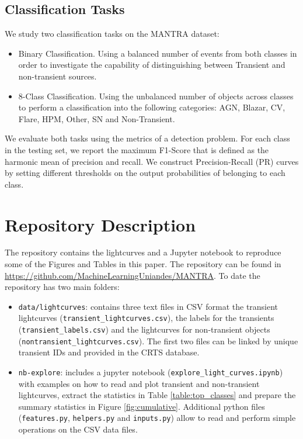 \documentclass{aastex62}
\begin{document}
\subsection{Classification Tasks} \label{subsection_classification}
We study two classification tasks on the MANTRA dataset: 

\begin{itemize}
\item {Binary Classification}.
Using a balanced number of events from both classes in order 
to investigate the capability of distinguishing between Transient
and non-transient sources.
\item{8-Class Classification}.
Using the unbalanced number of objects across classes to 
perform a classification into the following categories:
AGN, Blazar, CV, Flare, HPM, Other, SN and Non-Transient.
\end{itemize}

We evaluate both tasks using the metrics of a detection problem. 
For each class in the testing set, we report the maximum F1-Score 
that is defined as the harmonic mean of precision and recall. 
We construct Precision-Recall (PR) curves by setting different 
thresholds on the output probabilities of belonging to each class. 


\section{Repository Description} 
\label{sec:repository}

The repository contains the lightcurves and a Jupyter notebook
to reproduce some of the Figures and Tables in this paper.
The repository can be found in \url{https://github.com/MachineLearningUniandes/MANTRA}. 
To date the repository has two main folders:
\begin{itemize}

\item \texttt{data/lightcurves}: 
contains three text files in CSV format
the transient lightcurves (\texttt{transient\_lightcurves.csv}),
the labels for the transients (\texttt{transient\_labels.csv}) and
the lightcurves for non-transient objects
(\texttt{nontransient\_lightcurves.csv}). 
The first two files can be linked by unique transient IDs and
provided in the CRTS database. 
\item \texttt{nb-explore}: includes a jupyter notebook
  (\texttt{explore\_light\_curves.ipynb}) with examples on how to read
  and plot transient and non-transient lightcurves, extract the statistics in Table
  \ref{table:top_classes} and prepare the summary statistics in Figure
  \ref{fig:cumulative}. 
  Additional python files (\texttt{features.py},
  \texttt{helpers.py} and \texttt{inputs.py}) allow to read and perform
  simple operations on the CSV data files. 
\end{itemize}
\end{document}
